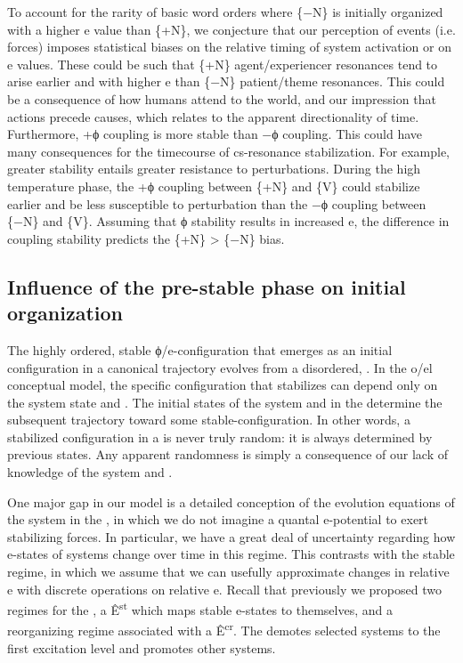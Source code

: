   To account for the rarity of basic word orders where \{−N\} is initially organized with a higher e value than \{+N\}, we conjecture that our perception of events (i.e.  forces) imposes statistical biases on the relative timing of system activation or on e values. These could be such that \{+N\} agent/experiencer resonances tend to arise earlier and with higher e than \{−N\} patient/theme resonances. This could be a consequence of how humans attend to the world, and our impression that actions precede causes, which relates to the apparent directionality of time. Furthermore, +ϕ coupling is more stable than −ϕ coupling. This could have many consequences for the timecourse of cs-resonance stabilization. For example, greater stability entails greater resistance to perturbations. During the high temperature phase, the +ϕ coupling between \{+N\} and \{V\} could stabilize earlier and be less susceptible to perturbation than the −ϕ coupling between \{−N\} and \{V\}. Assuming that ϕ stability results in increased e, the difference in coupling stability predicts the \{+N\} > \{−N\} bias.

\subsection{Influence of the pre-stable phase on initial organization}

The highly ordered, stable ϕ/e-con\-fig\-u\-ra\-tion that emerges as an initial configuration in a canonical trajectory evolves from a disordered, . In the o/el conceptual model, the specific configuration that stabilizes can depend only on the system state and . The initial states of the system and  in the  determine the subsequent trajectory toward some stable-con\-fig\-u\-ra\-tion. In other words, a stabilized configuration in a  is never truly random: it is always determined by previous states. Any apparent randomness is simply a consequence of our lack of knowledge of the system and .

  One major gap in our model is a detailed conception of the evolution equations of the system in the , in which we do not imagine a quantal e-potential to exert stabilizing forces. In particular, we have a great deal of uncertainty regarding how e-states of systems change over time in this regime. This contrasts with the stable regime, in which we assume that we can usefully approximate changes in relative e with discrete operations on relative e. Recall that previously we proposed two regimes for the , a  Ê\textsuperscript{st} which maps stable e-states to themselves, and a reorganizing regime associated with a  Ê\textsuperscript{cr}. The  demotes selected systems to the first excitation level and promotes other systems. 

